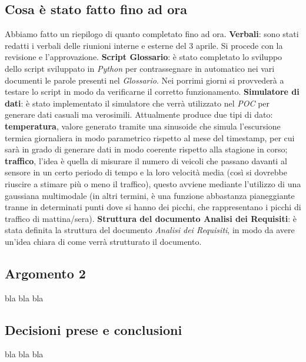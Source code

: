 \documentclass[italian,12pt]{article}
\begin{document}
\subsection{Cosa è stato fatto fino ad ora}
Abbiamo fatto un riepilogo di quanto completato fino ad ora.
\textbf{Verbali}: sono stati redatti i verbali delle riunioni interne e esterne del 3 aprile. Si procede con la revisione e l'approvazione.
\textbf{Script Glossario}: è stato completato lo sviluppo dello script sviluppato in \textit{Python} per contrassegnare in automatico nei vari documenti le parole presenti nel \textit{Glossario}. Nei porrimi giorni si provvederà a testare lo script in modo da verificarne il corretto funzionamento.
\textbf{Simulatore di dati}: è stato implementato il simulatore che verrà utilizzato nel \textit{POC} per generare dati casuali ma verosimili. Attualmente produce due tipi di dato: \textbf{temperatura}, valore generato tramite una sinusoide che simula l'escursione termica giornaliera in modo parametrico rispetto al mese del timestamp, per cui sarà in grado di generare dati in modo coerente rispetto alla stagione in corso; \textbf{traffico}, l'idea è quella di misurare il numero di veicoli che passano davanti al sensore in un certo periodo di tempo e la loro velocità media (così si dovrebbe riuscire a stimare più o meno il traffico), questo avviene mediante l'utilizzo di una gaussiana multimodale (in altri termini, è una funzione abbastanza pianeggiante tranne in determinati punti dove si hanno dei picchi, che rappresentano i picchi di traffico di mattina/sera).
\textbf{Struttura del documento Analisi dei Requisiti}: è stata definita la struttura del documento \textit{Analisi dei Requisiti}, in modo da avere un'idea chiara di come verrà strutturato il documento.
\textbf{}

\subsection{Argomento 2}
bla bla bla

\subsection{Decisioni prese e conclusioni}
bla bla bla
\end{document}
